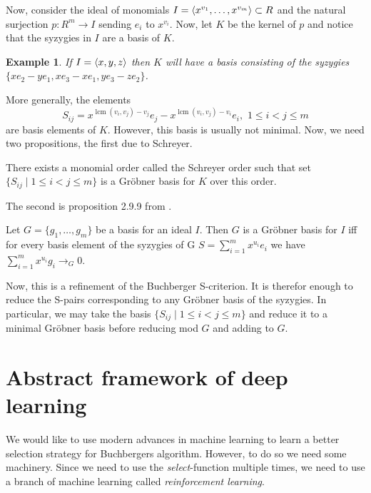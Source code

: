 \documentclass{article}
\theoremstyle{changedot}
\theoremstyle{changedotbreak}
\theoremstyle{nonumberplain}
\newtheorem{example}{Example}
\DeclarePairedDelimiter{\tuple}{\langle}{\rangle}
\DeclareMathOperator{\lcm}{lcm}
\begin{document}
Now, consider the ideal of monomials $I = \tuple{x^{v_{1}}, \dots, x^{v_{m}}} \subset R$ and the natural surjection $p : R^{m} \to I$ sending $e_{i}$ to $x^{v_{i}}$. Now, let $K$ be the kernel of $p$ and notice that the syzygies in $I$ are a basis of $K$.

\begin{example}
If $I = \tuple{x, y, z}$ then $K$ will have a basis consisting of the syzygies $\{x e_{2} - y e_{1}, x e_{3} - x e_{1}, y e_{3} - z e_{2}\}$.
\end{example}

More generally, the elements \[S_{ij} = x^{\lcm(v_{i}, v_{j}) - v_{j}} e_{j} - x^{\lcm(v_{i}, v_{j}) - v_{i}} e_{i}, \, \, 1 \leq i < j \leq m\] are basis elements of $K$. However, this basis is usually not minimal. Now, we need two propositions, the first due to Schreyer.

\begin{theorem}
 There exists a monomial order called the Schreyer order such that set $\{S_{ij} \mid 1 \leq i < j \leq m\}$ is a Gröbner basis for $K$ over this order.
\end{theorem}

The second is proposition 2.9.9 from \cite{IVA}.

\begin{theorem}
  Let $G = \{g_{1}, \dots, g_{m}\}$ be a basis for an ideal $I$. Then $G$ is a Gröbner basis for $I$ iff for every basis element of the syzygies of G $S = \sum_{i = 1}^{m} x^{u_{i}} e_{i}$ we have $\sum_{i=1}^{m} x^{u_{i}} g_{i} \to_{G} 0$.
\end{theorem}

Now, this is a refinement of the Buchberger S-criterion. It is therefor enough to reduce the S-pairs corresponding to any Gröbner basis of the syzygies. In particular, we may take the basis $\{S_{ij} \mid 1 \leq i < j \leq m\}$ and reduce it to a minimal Gröbner basis before reducing mod $G$ and adding to $G$.


\section{Abstract framework of deep learning}

We would like to use modern advances in machine learning to learn a better selection strategy for Buchbergers algorithm. However, to do so we need some machinery. Since we need to use the \emph{select}-function multiple times, we need to use a branch of machine learning called \emph{reinforcement learning}.
\end{document}
